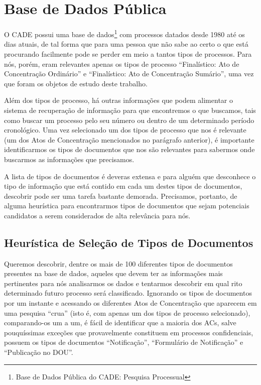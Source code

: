 \documentclass[11pt]{report}
\newcommand{\quotes}[1]{``#1''}
\begin{document}
\section{Base de Dados Pública}

\indent\indent O CADE possui uma base de dados\footnote[4]{Base de Dados Pública do CADE: Pesquisa Processual} com processos datados desde 1980 até os dias atuais, de tal forma que
para uma pessoa que não sabe ao certo o que está procurando facilmente pode se perder em meio a tantos tipos de processos. Para nós, porém, eram relevantes apenas
os tipos de processo \quotes{Finalístico: Ato de Concentração Ordinário} e \quotes{Finalístico: Ato de Concentração Sumário}, uma vez que foram os objetos de estudo deste trabalho.

Além dos tipos de processo, há outras informações que podem alimentar o sistema de recuperação de informação para que encontremos o que buscamos, tais como buscar um processo pelo
seu número ou dentro de um determinado período cronológico. Uma vez selecionado um dos tipos de processo que nos é relevante (um dos Atos de Concentração mencionados no parágrafo
anterior), é importante identificarmos os tipos de documentos que nos são relevantes para sabermos onde buscarmos as informações que precisamos.

A lista de tipos de documentos é deveras extensa e para alguém que desconhece o tipo de informação que está contido em cada um destes tipos de documentos, descobrir pode ser uma tarefa
bastante demorada. Precisamos, portanto, de alguma heurística para encontrarmos tipos de documentos que sejam potenciais candidatos a serem considerados de alta relevância para nós.

\subsection{Heurística de Seleção de Tipos de Documentos}

\indent\indent Queremos descobrir, dentre os mais de 100 diferentes tipos de documentos presentes na base de dados, aqueles que devem
ter as informações mais pertinentes para nós analisarmos os dados e tentarmos descobrir em qual rito determinado futuro processo será classificado.
Ignorando os tipos de documentos por um instante e acessando os diferentes Atos de Concentração que aparecem em uma pesquisa \quotes{crua} (isto é, com apenas um dos tipos de
processo selecionado), comparando-os um a um, é fácil de identificar que a maioria dos ACs, salve pouquíssimas exceções que provavelmente constituem em processos confidenciais,
possuem os tipos de documentos \quotes{Notificação}, \quotes{Formulário de Notificação} e \quotes{Publicação no DOU}.
\end{document}
